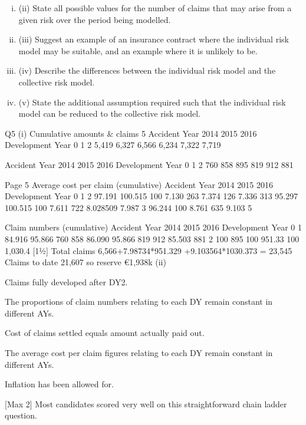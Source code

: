 \documentclass[a4paper,12pt]{article}
\begin{document}
\begin{enumerate}
\begin{enumerate}[(i)]
\item (ii) State all possible values for the number of claims that may arise from a given
risk over the period being modelled.
\item 
(iii) Suggest an example of an insurance contract where the individual risk model
may be suitable, and an example where it is unlikely to be.
\item 
(iv) Describe the differences between the individual risk model and the collective
risk model.
\item 
(v) State the additional assumption required such that the individual risk model
can be reduced to the collective risk model.
\end{enumerate}
Q5
(i)
Cumulative amounts & claims
5
Accident Year
2014
2015
2016
Development Year
0
1
2
5,419 6,327 6,566
6,234 7,322
7,719

Accident Year
2014
2015
2016
Development Year
0
1
2
760
858
895
819
912
881

Page 5%
Average cost per claim (cumulative)
Accident Year
2014
2015
2016
Development Year
0
1
2
97.191%
100.515%
100%
7.130 263
7.374 126
7.336 313
95.297%
100.515%
100%
7.611 722
8.028509
7.987 3
96.244%
100%
8.761 635
9.103 5

Claim numbers (cumulative)
Accident Year
2014
2015
2016
Development Year
0
1
84.916%
95.866%
760
858
86.090%
95.866%
819
912
85.503%
881
2
100%
895
100%
951.33
100%
1,030.4
[11⁄2]
Total claims 6,566+7.98734*951.329 +9.103564*1030.373 = 23,545
Claims to date 21,607 so reserve €1,938k
(ii)


Claims fully developed after DY2.

The proportions of claim numbers relating to each DY remain constant in
different AYs.

Cost of claims settled equals amount actually paid out.

The average cost per claim figures relating to each DY remain constant in
different AYs.

Inflation has been allowed for.

[Max 2]
Most candidates scored very well on this straightforward chain ladder
question.




\end{enumerate}
\end{document}
